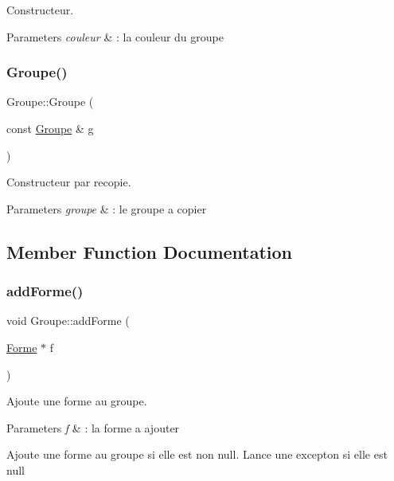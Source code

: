 Constructeur. 


\begin{DoxyParams}{Parameters}
{\em couleur} & \+: la couleur du groupe \\
\hline
\end{DoxyParams}
\mbox{\label{class_groupe_adf726dba5919371e203f34441215ef2d}} 
\subsubsection{\texorpdfstring{Groupe()}{Groupe()}\hspace{0.1cm}{\footnotesize\ttfamily [2/2]}}
{\footnotesize\ttfamily Groupe\+::\+Groupe (\begin{DoxyParamCaption}\item[{const \mbox{\hyperlink{class_groupe}{Groupe}} \&}]{g }\end{DoxyParamCaption})}



Constructeur par recopie. 


\begin{DoxyParams}{Parameters}
{\em groupe} & \+: le groupe a copier \\
\hline
\end{DoxyParams}


\subsection{Member Function Documentation}
\mbox{\label{class_groupe_ac677843fff8abf6c432295c84b91462d}} 
\subsubsection{\texorpdfstring{addForme()}{addForme()}}
{\footnotesize\ttfamily void Groupe\+::add\+Forme (\begin{DoxyParamCaption}\item[{\mbox{\hyperlink{class_forme}{Forme}} $\ast$}]{f }\end{DoxyParamCaption})}



Ajoute une forme au groupe. 


\begin{DoxyParams}{Parameters}
{\em f} & \+: la forme a ajouter\\
\hline
\end{DoxyParams}
Ajoute une forme au groupe si elle est non null. Lance une excepton si elle est null \mbox{\label{class_groupe_a614513db9e80b6e6c0811da16d89bb19}} 
